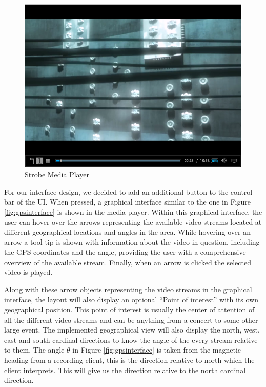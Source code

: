 \begin{figure}[ht!]
\begin{center}
	\includegraphics[scale=0.7]{Media_player.png}
	\caption{Strobe Media Player}
	\label{fig:mediaplayer}
\end{center}
\end{figure}

For our interface design, we decided to add an additional button to the control bar of the UI. When pressed, a graphical interface similar to the one in Figure \ref{fig:gpsinterface} is shown in the media player. Within this graphical interface, the user can hover over the arrows representing the available video streams located at different geographical locations and angles in the area. While hovering over an arrow a tool-tip is shown with information about the video in question, including the GPS-coordinates and the angle, providing the user with a comprehensive overview of the available stream. Finally, when an arrow is clicked the selected video is played.

Along with these arrow objects representing the video streams in the graphical interface, the layout will also display an optional “Point of interest” with its own geographical position. This point of interest is usually the center of attention of all the different video streams and can be anything from a concert to some other large event. The implemented geographical view will also display the north, west, east and south cardinal directions to know the angle of the every stream relative to them. The angle $\theta$ in Figure \ref{fig:gpsinterface} is taken from the magnetic heading from a recording client, this is the direction relative to north which the client interprets. This will give us the direction relative to the north cardinal direction.


